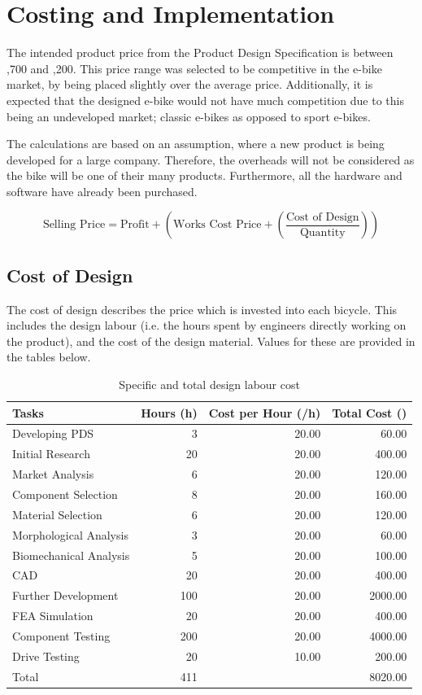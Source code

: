 \documentclass[a4paper,11pt]{article}
\begin{document}
\section{Costing and Implementation}

The intended product price from the Product Design Specification is between ,700 and ,200. This price range was selected to be competitive in the e-bike market, by being placed slightly over the average price. Additionally, it is expected that the designed e-bike would not have much competition due to this being an undeveloped market; classic e-bikes as opposed to sport e-bikes. 

The calculations are based on an assumption, where a new product is being developed for a large company. Therefore, the overheads will not be considered as the bike will be one of their many products. Furthermore, all the hardware and software have already been purchased. 

\[
	\text{Selling Price} = \text{Profit} + \left(\text{Works Cost Price} + \left(\frac{\text{Cost of Design}}{\text{Quantity}}\right)\right)
\]

\subsection{Cost of Design}

The cost of design describes the price which is invested into each bicycle. This includes the design labour (i.e. the hours spent by engineers directly working on the product), and the cost of the design material. Values for these are provided in the tables below.

\begin{table}[!ht]
	\centering
	\caption{Specific and total design labour cost}
	\begin{tabular}{l r r r}
		\hline
		\multicolumn{1}{l}{Tasks}&\multicolumn{1}{l}{Hours (h)}&\multicolumn{1}{l}{Cost per Hour (\textsterling/h)}&\multicolumn{1}{l}{Total Cost (\textsterling)}\\\hline
		Developing PDS	&3&20.00&60.00\\
		Initial Research&20&20.00&400.00\\
		Market Analysis&6&20.00&120.00\\
		Component Selection&8&20.00&160.00\\
		Material Selection&6&20.00&120.00\\
		Morphological Analysis&3&20.00&60.00\\
		Biomechanical Analysis&5&20.00&100.00\\
		CAD&20&20.00&400.00\\
		Further Development&100&20.00&2000.00\\
		FEA Simulation&20&20.00&400.00\\
		Component Testing&200&20.00&4000.00\\
		Drive Testing&20&10.00&200.00\\\hline
		Total&411&&8020.00\\\hline
	\end{tabular}
\end{table}
\end{document}
